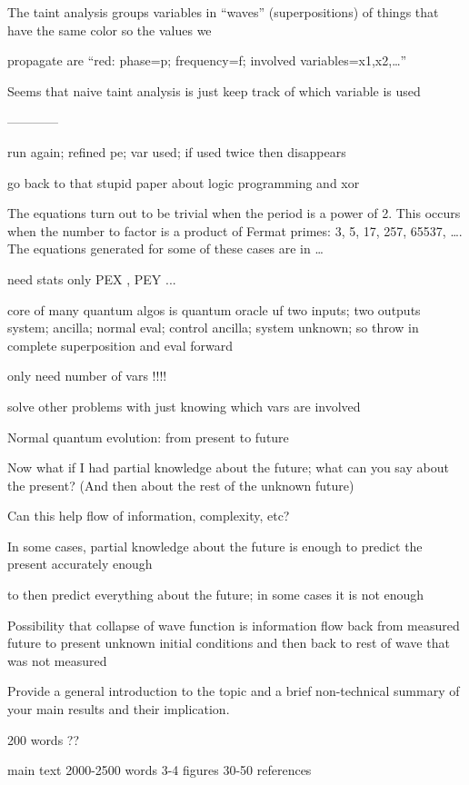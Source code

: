 \documentclass{article}
\begin{document}
\begin{refsection}
   The taint analysis groups variables in “waves” (superpositions) of things that have the same color so the values we

     propagate are “red: phase=p; frequency=f; involved variables={x1,x2,…}”

   Seems that naive taint analysis is just keep track of which variable is used

------------

run again; refined pe; var used; if used twice then disappears

go back to that stupid paper about logic programming and xor 

The equations turn out to be trivial when the period is a power of
2. This occurs when the number to factor is a product of Fermat
primes: 3, 5, 17, 257, 65537, \ldots. The equations generated for some
of these cases are in \ldots


need stats only
PEX , PEY ...

core of many quantum algos is quantum oracle uf
two inputs; two outputs
system; ancilla;
normal eval; control ancilla; system unknown; so throw in complete superposition and
eval forward

only need number of vars !!!!

solve other problems with just knowing which vars are involved

   Normal quantum evolution: from present to future

   Now what if I had partial knowledge about the future; what can you
   say about the present?  (And then about the rest of the unknown
   future)

   Can this help flow of information, complexity, etc?  

   In some cases, partial knowledge about the future is enough to
   predict the present accurately enough

   to then predict everything about the future; in some cases it is not enough

   Possibility that collapse of wave function is information flow back
   from measured future to present unknown initial conditions and then
   back to rest of wave that was not measured


Provide a general introduction to the topic and a brief non-technical
summary of your main results and their implication.

200 words ??

main text
  2000-2500 words
  3-4 figures
  30-50 references


\end{refsection}
\end{document}
